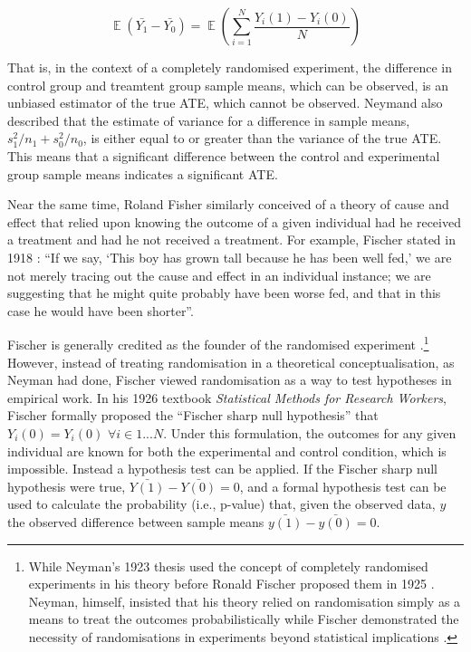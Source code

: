 \documentclass[12pt]{article}
\DeclareMathOperator{\E}{\mathbb{E}}
\DeclareMathOperator{\E}{\mathbb{E}}
\begin{document}
\begin{equation}\label{eq:NeymanATEExpectations}
  \E(\bar{Y_1} - \bar{Y_0}) = \E(\sum^N_{i=1} \frac{Y_i(1) - Y_i(0)}{N})
\end{equation}

That is, in the context of a completely randomised experiment, the difference in control group and treamtent group sample means, which can be observed, is an unbiased estimator of the true ATE, which cannot be observed. Neymand also described that the estimate of variance for a difference in sample means, $s_1^2/n_1 + s_0^2/n_0$, is either equal to or greater than the variance of the true ATE. This means that a significant difference between the control and experimental group sample means indicates a significant ATE.

Near the same time, Roland Fisher similarly conceived of a theory of cause and effect that relied upon knowing the outcome of a given individual had he received a treatment and had he not received a treatment. For example, Fischer stated in 1918 \citep{fisherCausesHumanVariability1919}:  ``If we say, `This boy has grown tall because he has been well fed,' we are not merely tracing out the cause and effect in an individual instance; we are suggesting that he might quite probably have been worse fed, and that in this case he would have been shorter''.

Fischer is generally credited as the founder of the randomised experiment \citep{rubinCausalInferenceUsing2005}.\footnote{While Neyman's 1923 thesis used the concept of completely randomised experiments in his theory before Ronald Fischer proposed them in 1925 \citep{fisherStatisticalMethodsResearch1925}. Neyman, himself, insisted that his theory relied on randomisation simply as a means to treat the outcomes probabilistically while Fischer demonstrated the necessity of randomisations in experiments beyond statistical implications \citep{reidNeymanLife1998}.} However, instead of treating randomisation in a theoretical conceptualisation, as Neyman had done, Fischer viewed randomisation as a way to test hypotheses in empirical work. In his 1926 textbook \emph{Statistical Methods for Research Workers}, Fischer formally proposed the ``Fischer sharp null hypothesis'' that $Y_i(0) = Y_i(0)$ $\forall i \in {1 ... N}$. Under this formulation, the outcomes for any given individual are known for both the experimental and control condition, which is impossible. Instead a hypothesis test can be applied. If the Fischer sharp null hypothesis were true, $\bar{Y(1)} - \bar{Y(0)} = 0$, and a formal hypothesis test can be used to calculate the probability (i.e., p-value) that, given the observed data, $y$ the observed difference between sample means $\bar{y(1)} - \bar{y(0)} = 0$.
\end{document}
